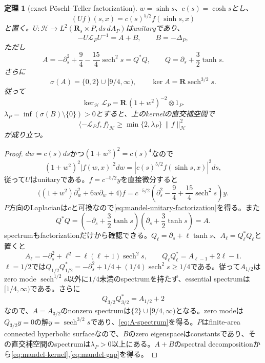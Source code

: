 \documentclass[11pt,a4paper]{ltjsarticle}
\newtheorem{theorem}{定理}[section]
\theoremstyle{definition}
\theoremstyle{remark}
\newcommand{\RR}{\mathbf R}
\begin{document}
\begin{theorem}[exact Pöschl--Teller factorization]\label{thm:mandel-factorization}
$w=\sinh s$、$c(s)=\cosh s$とし、
\[
 (Uf)(s,x)=c(s)^{5/2}f(\sinh s,x)
\]
と置く。$U:\mathscr H\to L^2(\RR_s\times P,ds\,dA_P)$はunitaryであり、
\begin{equation}\label{eq:mandel-unitary-factorization}
 -U\mathscr L_PU^{-1}
 =A+B,
 \qquad
 B=-\Delta_P,
\end{equation}
ただし
\begin{equation}\label{eq:poschl-teller-A}
 A=-\partial_s^2+\frac94-\frac{15}{4}\operatorname{sech}^2s
 =Q^*Q,
 \qquad
 Q=\partial_s+\frac32\tanh s.
\end{equation}
さらに
\begin{equation}\label{eq:A-spectrum}
 \sigma(A)=\{0,2\}\cup[9/4,\infty),
 \qquad
 \ker A=\RR\operatorname{sech}^{3/2}s.
\end{equation}
従って
\begin{equation}\label{eq:mandel-kernel}
 \ker_{\mathscr H}\mathscr L_P
 =\RR\,(1+w^2)^{-2}\otimes1_P.
\end{equation}
$\lambda_P=\inf(\sigma(B)\setminus\{0\})>0$とすると、上のkernelの直交補空間で
\begin{equation}\label{eq:mandel-gap}
 \langle-\mathscr L_Pf,f\rangle_{\mathscr H}
 \ge \min\{2,\lambda_P\}\,\|f\|_{\mathscr H}^2
\end{equation}
が成り立つ。
\end{theorem}

\begin{proof}
$dw=c(s)ds$かつ$(1+w^2)^2=c(s)^4$なので
\[
 (1+w^2)^2|f(w,x)|^2dw
 =|c(s)^{5/2}f(\sinh s,x)|^2ds,
\]
従って$U$はunitaryである。$f=c^{-5/2}y$を直接微分すると
\begin{equation}\label{eq:conjugation-calculation}
 \bigl((1+w^2)\partial_w^2+6w\partial_w+4\bigr)f
 =c^{-5/2}
 \left(\partial_s^2-\frac94+\frac{15}{4}\operatorname{sech}^2s\right)y.
\end{equation}
$P$方向のLaplacianは$c$と可換なので\eqref{eq:mandel-unitary-factorization}を得る。また
\[
 Q^*Q
 =\left(-\partial_s+\frac32\tanh s\right)
  \left(\partial_s+\frac32\tanh s\right)
 =A.
\]
spectrumもfactorizationだけから確認できる。$Q_\ell=\partial_s+\ell\tanh s$、$A_\ell=Q_\ell^*Q_\ell$と置くと
\[
 A_\ell=-\partial_s^2+\ell^2-\ell(\ell+1)\operatorname{sech}^2s,
 \qquad
 Q_\ell Q_\ell^*=A_{\ell-1}+2\ell-1.
\]
$\ell=1/2$では$Q_{1/2}Q_{1/2}^*=-\partial_s^2+1/4+(1/4)\operatorname{sech}^2s\ge1/4$である。従って$A_{1/2}$はzero mode $\operatorname{sech}^{1/2}s$以外に$1/4$未満のspectrumを持たず、essential spectrumは$[1/4,\infty)$である。さらに
\[
 Q_{3/2}Q_{3/2}^*=A_{1/2}+2
\]
なので、$A=A_{3/2}$のnonzero spectrumは$\{2\}\cup[9/4,\infty)$となる。zero modeは$Q_{3/2}y=0$の解$y=\operatorname{sech}^{3/2}s$であり、\eqref{eq:A-spectrum}を得る。$P$はfinite-area connected hyperbolic surfaceなので、$B$のzero eigenspaceはconstantsであり、その直交補空間のspectrumは$\lambda_P>0$以上にある。$A+B$のspectral decompositionから\eqref{eq:mandel-kernel},\eqref{eq:mandel-gap}を得る。
\end{proof}
\end{document}
